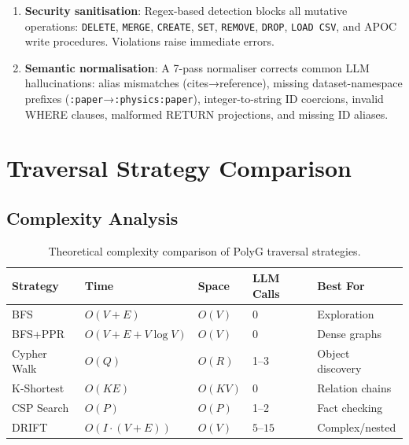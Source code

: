 \documentclass[12pt,a4paper]{article}
\begin{document}
\begin{enumerate}
  \item \textbf{Security sanitisation}: Regex-based detection blocks all
    mutative operations: \texttt{DELETE}, \texttt{MERGE}, \texttt{CREATE},
    \texttt{SET}, \texttt{REMOVE}, \texttt{DROP}, \texttt{LOAD CSV}, and
    APOC write procedures. Violations raise immediate errors.
  \item \textbf{Semantic normalisation}: A 7-pass normaliser corrects
    common LLM hallucinations: alias mismatches (cites→reference),
    missing dataset-namespace prefixes (\texttt{:paper}→\texttt{:physics:paper}),
    integer-to-string ID coercions, invalid WHERE clauses, malformed RETURN
    projections, and missing ID aliases.
\end{enumerate}

\section{Traversal Strategy Comparison}

\subsection{Complexity Analysis}

\begin{table}[htbp]
\centering
\caption{Theoretical complexity comparison of PolyG traversal strategies.}
\label{tab:complexity}
\begin{tabularx}{\linewidth}{lXXXX}
\toprule
\textbf{Strategy} & \textbf{Time} & \textbf{Space} & \textbf{LLM Calls} & \textbf{Best For} \\
\midrule
\rowcolor{nodeblue!8}
BFS            & $O(V+E)$ & $O(V)$ & 0 & Exploration \\
BFS+PPR        & $O(V+E+V\log V)$ & $O(V)$ & 0 & Dense graphs \\
\rowcolor{nodeblue!8}
Cypher Walk    & $O(Q)$ & $O(R)$ & 1--3 & Object discovery \\
K-Shortest     & $O(KE)$ & $O(KV)$ & 0 & Relation chains \\
\rowcolor{nodeblue!8}
CSP Search     & $O(P)$ & $O(P)$ & 1--2 & Fact checking \\
DRIFT          & $O(I \cdot (V+E))$ & $O(V)$ & $5$--$15$ & Complex/nested \\
\bottomrule
\end{tabularx}
\end{table}
\end{document}
